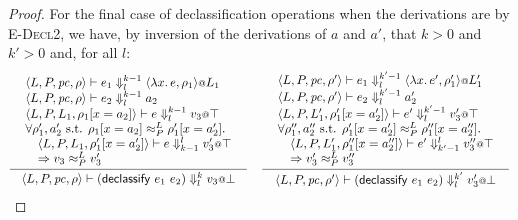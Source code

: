 \documentclass{article}
\makeatletter
\theoremstyle{definition}
\newcommand{\at}{\ensuremath{{\scriptstyle{@}}}}
\newcommand{\pc}{\ensuremath{{\mathit{pc}}}}
\makeatother
\begin{document}
\begin{proof}
  For the final case of declassification operations when the derivations
  are by \textsc{E-Decl2}, we have, by inversion of the derivations of $a$
  and $a'$, that $k > 0$ and $k' > 0$ and, for all $l$:
  \begin{gather*}
    \inference{
      {\begin{array}{l}
          \langle{L, P, \pc, \rho\rangle} |-
          e_1
          \Downarrow^{k-1}_{l}
          \langle{\lambda{x}.\, e, \rho_1\rangle} \at L_1
          \\
          \langle{L, P, \pc, \rho\rangle} |-
          e_2
          \Downarrow^{k-1}_{l}
          a_2
          \\
          \langle{L, P, L_1, \rho_1[x = a_2]\rangle} |-
          e
          \Downarrow^{k-1}_{l}
          v_3 \at \top
          \\
          \forall{\rho_1', a_2' \text{ s.t. }
            \rho_1[x = a_2] \approx^{L}_{P} \rho_1'[x = a_2']}.
          \\\quad
          \langle{L, P, L_1, \rho_1'[x = a_2']\rangle} |-
          e
          \Downarrow^{l}_{k-1}
          v_3' \at \top
          \\\quad =>
          v_3 \approx^{L}_{P} v_3'
        \end{array}}
    }{
      \langle{L, P, \pc, \rho\rangle} |-
      (\mathsf{declassify}\ e_1\ e_2)
      \Downarrow^{k}_{l}
      v_3 \at \bot
    }
    \quad
    \inference{
      {\begin{array}{l}
          \langle{L, P, \pc, \rho'\rangle} |-
          e_1
          \Downarrow^{k'-1}_{l}
          \langle{\lambda{x}.\, e', \rho_1'\rangle} \at L_1'
          \\
          \langle{L, P, \pc, \rho'\rangle} |-
          e_2
          \Downarrow^{k'-1}_{l}
          a_2'
          \\
          \langle{L, P, L_1', \rho_1'[x = a_2']\rangle} |-
          e'
          \Downarrow^{k'-1}_{l}
          v_3' \at \top
          \\
          \forall{\rho_1'', a_2'' \text{ s.t. }
            \rho_1'[x = a_2'] \approx^{L}_{P} \rho_1''[x = a_2'']}.
          \\\quad
          \langle{L, P, L_1', \rho_1''[x = a_2'']\rangle} |-
          e'
          \Downarrow^{l}_{k'-1}
          v_3'' \at \top
          \\\quad =>
          v_3' \approx^{L}_{P} v_3''
        \end{array}}
    }{
      \langle{L, P, \pc, \rho'\rangle} |-
      (\mathsf{declassify}\ e_1\ e_2)
      \Downarrow^{k'}_{l}
      v_3' \at \bot
    }
  \end{gather*}


\end{proof}
\end{document}

